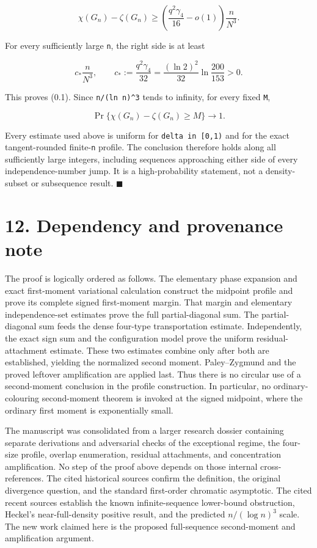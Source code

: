 \documentclass[
  11pt,
  a4paper,
]{article}
\begin{document}
\[
 \chi(G_n)-\zeta(G_n)
 \ge\left(\frac{q^2\gamma_4}{16}-o(1)\right)
        \frac n{N^3}.                                    \tag{11.1}
\]

For every sufficiently large \texttt{n}, the right side is at least

\[
 c_*\frac n{N^3},\qquad
 c_*:=\frac{q^2\gamma_4}{32}
 =\frac{(\ln2)^2}{32}\ln\frac{200}{153}>0.              \tag{11.2}
\]

This proves (0.1). Since \texttt{n/(ln\ n)\^{}3} tends to infinity, for
every fixed \texttt{M},

\[
 \Pr\{\chi(G_n)-\zeta(G_n)\ge M\}\longrightarrow1.      \tag{11.3}
\]

Every estimate used above is uniform for \texttt{delta\ in\ {[}0,1)} and
for the exact tangent-rounded finite-\texttt{n} profile. The conclusion
therefore holds along all sufficiently large integers, including
sequences approaching either side of every independence-number jump. It
is a high-probability statement, not a density-subset or subsequence
result. \(\blacksquare\)

\section{12. Dependency and provenance
note}\label{dependency-and-provenance-note}

The proof is logically ordered as follows. The elementary phase
expansion and exact first-moment variational calculation construct the
midpoint profile and prove its complete signed first-moment margin. That
margin and elementary independence-set estimates prove the full
partial-diagonal sum. The partial-diagonal sum feeds the dense four-type
transportation estimate. Independently, the exact sign sum and the
configuration model prove the uniform residual-attachment estimate.
These two estimates combine only after both are established, yielding
the normalized second moment. Paley--Zygmund and the proved leftover
amplification are applied last. Thus there is no circular use of a
second-moment conclusion in the profile construction. In particular, no
ordinary-colouring second-moment theorem is invoked at the signed
midpoint, where the ordinary first moment is exponentially small.

The manuscript was consolidated from a larger research dossier
containing separate derivations and adversarial checks of the
exceptional regime, the four-size profile, overlap enumeration, residual
attachments, and concentration amplification. No step of the proof above
depends on those internal cross-references. The cited historical sources
confirm the definition, the original divergence question, and the
standard first-order chromatic asymptotic. The cited recent sources
establish the known infinite-sequence lower-bound obstruction, Heckel's
near-full-density positive result, and the predicted \(n/(\log n)^3\)
scale. The new work claimed here is the proposed full-sequence
second-moment and amplification argument.
\end{document}
